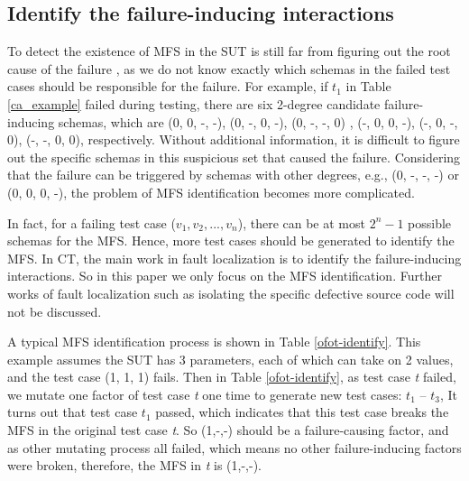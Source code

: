 \documentclass[10pt,journal,compsoc]{IEEEtran}
\begin{document}
%
%
%


\subsection{Identify the failure-inducing interactions}\label{sec:back:iden}
To detect the existence of MFS in the SUT is still far from figuring out the root cause of the failure \cite{colbourn2008locating,martinez2008algorithms,martinez2009locating}, as we do not know exactly which schemas in the failed test cases should be responsible for the failure. For example, if $t_{1}$ in Table \ref{ca_example} failed during testing, there are six 2-degree candidate failure-inducing schemas, which are (0, 0, -, -), (0, -, 0, -), (0, -, -, 0) , (-, 0, 0, -), (-, 0, -, 0), (-, -, 0, 0), respectively. Without
additional information, it is difficult to figure out the specific schemas in this suspicious set that caused the failure. Considering that the failure can be triggered by schemas with other degrees, e.g., (0, -, -, -) or (0, 0, 0, -), the problem of MFS identification becomes more complicated.

In fact, for a failing test case ($v_{1},v_{2},...,v_{n}$), there can be at most $2^{n} - 1$ possible schemas for the MFS. Hence, more test cases should be generated to identify the MFS. In CT, the main work in fault localization is to identify the failure-inducing interactions. So in this paper we only focus on the MFS identification. Further works of fault localization such as isolating the specific defective source code will not be discussed.

A typical MFS identification process is shown in Table \ref{ofot-identify}. This example assumes the SUT has 3 parameters, each of which can take on 2 values, and the test case (1, 1, 1) fails. Then in Table \ref{ofot-identify}, as test case \emph{t} failed, we mutate one factor of test case \emph{t} one time to generate new test cases: $t_{1}$ -- $t_{3}$, It turns out that test case $t_{1}$ passed, which indicates that this test case breaks the MFS in the original test case \emph{t}. So (1,-,-) should be a failure-causing factor, and as other mutating process all failed, which means no other failure-inducing factors were broken, therefore, the MFS in \emph{t} is (1,-,-).
\end{document}
